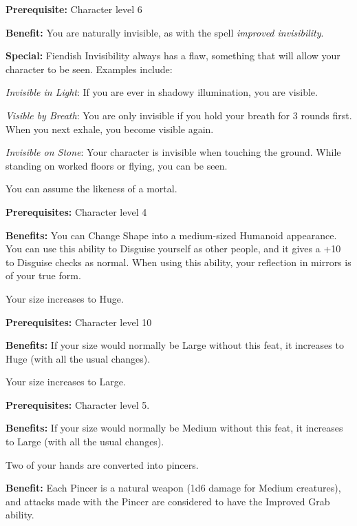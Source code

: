 \textbf{Prerequisite:} Character level 6

\textbf{Benefit:} You are naturally invisible, as with the spell \textit{improved invisibility}.

\textbf{Special:} Fiendish Invisibility always has a flaw, something that will allow your character to be seen. Examples include:

\textit{Invisible in Light}: If you are ever in shadowy illumination, you are visible.

\textit{Visible by Breath}: You are only invisible if you hold your breath for 3 rounds first. When you next exhale, you become visible again.

\textit{Invisible on Stone}: Your character is invisible when touching the ground. While standing on worked floors or flying, you can be seen.


You can assume the likeness of a mortal.

\textbf{Prerequisites:} Character level 4

\textbf{Benefits:} You can Change Shape into a medium-sized Humanoid appearance. You can use this ability to Disguise yourself as other people, and it gives a +10 to Disguise checks as normal. When using this ability, your reflection in mirrors is of your true form.


Your size increases to Huge.

\textbf{Prerequisites:} Character level 10

\textbf{Benefits:} If your size would normally be Large without this feat, it increases to Huge (with all the usual changes).


Your size increases to Large.

\textbf{Prerequisites:} Character level 5.

\textbf{Benefits:} If your size would normally be Medium without this feat, it increases to Large (with all the usual changes).


Two of your hands are converted into pincers.

\textbf{Benefit:} Each Pincer is a natural weapon (1d6 damage for Medium creatures), and attacks made with the Pincer are considered to have the Improved Grab ability.

